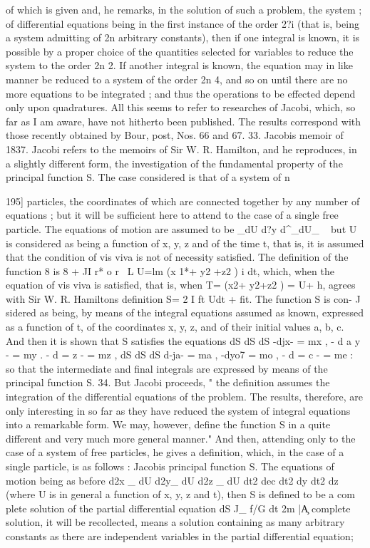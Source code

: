 \documentclass[12pt,a4paper]{article}
\theoremstyle{definition}
\begin{document}
of which is given and, he remarks, in the solution of such a problem, the system
;
of differential equations being in the first instance of the order 2?i (that is, being
a system admitting of 2n arbitrary constants), then if one integral is known, it is
possible by a proper choice of the quantities selected for variables to reduce the system
to the order 2n 2. If another integral is known, the equation may in like manner
be reduced to a system of the order 2n 4, and so on until there are no more
equations to be integrated ; and thus the operations to be effected depend only upon
quadratures. All this seems to refer to researches of Jacobi, which, so far as I am
aware, have not hitherto been published. The results correspond with those recently
obtained by Bour, post, Nos. 66 and 67.
33. Jacobis memoir of 1837. Jacobi refers to the memoirs of Sir W. R. Hamilton,
and he reproduces, in a slightly different form, the investigation of the fundamental
property of the principal function S. The case considered is that of a system of n



195]
particles, the coordinates of which are connected together by any number of equations ;
but it will be sufficient here to attend to the case of a single free particle. The
equations of motion are assumed to be
_dU
d?y d^_dU_
~
but U is considered as being a function of x, y, z and of the time t, that is, it is
assumed that the condition of vis viva is not of necessity satisfied. The definition of
the function 8 is
8 + JI r* o r \ L U=lm (x 1*+ y2 +z2 ) i dt,
which, when the equation of vis viva is satisfied, that is, when
T= \m(x2+ y2+z2
)
= U+
h,
agrees with Sir W. R. Hamiltons definition S= 2 I ft Udt + fit. The function S is con-
J
sidered as being, by means of the integral equations assumed as known, expressed as
a function of t, of the coordinates x, y, z, and of their initial values a, b, c. And
then it is shown that S satisfies the equations
dS dS dS
-djx- = mx , - d a y - = my . - d = z - = mz ,
dS dS dS
d-ja- = ma , -dyo7 = mo , - d = c - = me :
so that the intermediate and final integrals are expressed by means of the principal
function S.
34. But Jacobi proceeds, " the definition assumes the integration of the differential
equations of the problem. The results, therefore, are only interesting in so far as they
have reduced the system of integral equations into a remarkable form. We may,
however, define the function S in a quite different and very much more general manner."
And then, attending only to the case of a system of free particles, he gives a definition,
which, in the case of a single particle, is as follows :
Jacobis principal function S. The equations of motion being as before
d2x _ dU d2y_ dU d2z _ dU
dt2 dec dt2 dy dt2 dz
(where U is in general a function of x, y, z and t), then S is defined to be a com
plete solution of the partial differential equation
dS
J_ f/G
dt 2m |\c
A
complete solution, it will be recollected, means a solution containing as many
arbitrary constants as there are independent variables in the partial differential equation;
\end{document}
